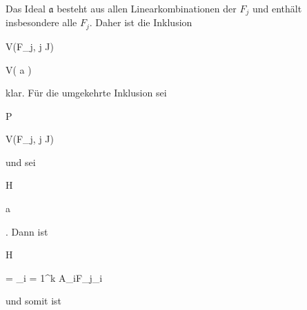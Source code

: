 {


Das Ideal ${\mathfrak a}$ besteht aus allen Linearkombinationen der $F_j$ und enthält insbesondere alle $F_j$. Daher ist die Inklusion


\mavergleichskette


{\vergleichskette


{ V(F_j, j \in J)
}


{ \supseteq }{ V( {\mathfrak a} )
}


{  }{
}


{    }{
}


{   }{
}


}
{}{}{}
klar. Für die umgekehrte Inklusion sei


\mavergleichskette


{\vergleichskette


{ P
}


{ \in }{ V(F_j, j \in J)
}


{  }{
}


{    }{
}


{   }{
}


}
{}{}{}
und sei


\mavergleichskette


{\vergleichskette


{ H
}


{ \in }{ {\mathfrak a}
}


{  }{
}


{    }{
}


{   }{
}


}
{}{}{.}
Dann ist


\mavergleichskette


{\vergleichskette


{ H
}


{ = }{ \sum_{i = 1}^k A_iF_{j_i }
}


{  }{
}


{    }{
}


{   }{
}


}
{}{}{}
 {} {}
und somit ist


\mavergleichskettedisp


}
